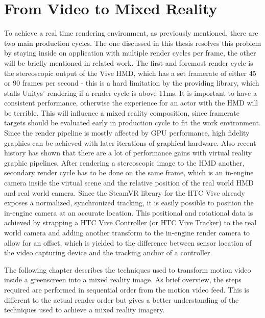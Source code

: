 %
\chapter{From Video to Mixed Reality}
\label{chap:video2mr}


To achieve a real time rendering environment, as previously mentioned, there 
are two main production cycles. The one discussed in this thesis resolves this 
problem by staying inside on application with multiple render cycles per frame, 
the other will be briefly mentioned in related work. 
\newline
The first and foremost render cycle is the stereoscopic output of the Vive HMD, 
which has a set framerate of either 45 or 90 frames per second - this is a hard 
limitation by the providing library, which stalls Unitys' rendering if a render 
cycle is above 11ms. It is important  to have a consistent performance, 
otherwise the experience for an actor with the HMD will be terrible. This will 
influence a mixed reality composition, since framerate targets should be 
evaluated early in production cycle to fit the work environment. Since the 
render pipeline is mostly affected by GPU performance, high fidelity graphics 
can be achieved with later iterations of graphical hardware. Also recent 
history has shown that there are a lot of performance gains with virtual 
reality graphic pipelines.
\newline
After rendering a stereoscopic image to the HMD another, secondary render cycle 
has to be done on the same frame, which is an in-engine camera inside the 
virtual scene and the relative position of the real world HMD and real world 
camera. Since the SteamVR library for the HTC Vive already exposes a 
normalized, synchronized tracking, it is easily possible to position the 
in-engine camera at an accurate location. This positional and rotational data 
is achieved by strapping a HTC Vive Controller (or HTC Vive Tracker) to the 
real world camera and adding another transform to the in-engine render camera 
to allow for an offset, which is yielded to the difference between sensor 
location of the video capturing device and the tracking anchor of a controller.

The following chapter describes the techniques used to transform motion video 
inside a greenscreen into a mixed reality image. As brief overview, the steps 
required are performed in sequential order from the motion video feed. This is 
different to the actual render order but gives a better understanding of the 
techniques used to achieve a mixed reality imagery.

